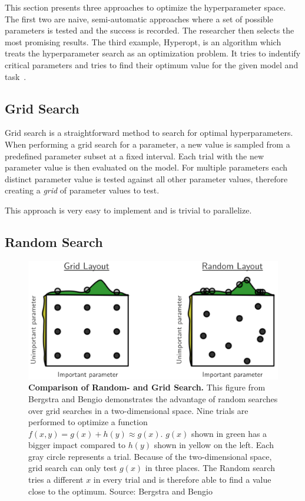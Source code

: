 This section presents three approaches to optimize the hyperparameter space. The first two are naive, semi-automatic approaches where a set of possible parameters is tested and the success is recorded. The researcher then selects the most promising results. The third example, Hyperopt, is an algorithm which treats the hyperparameter search as an optimization problem. It tries to indentify critical parameters and tries to find their optimum value for the given model and task~\cite{Bergstra2013}.


\subsection{Grid Search}

Grid search is a straightforward method to search for optimal hyperparameters. When performing a grid search for a parameter, a new value is sampled from a predefined parameter subset at a fixed interval. Each trial with the new parameter value is then evaluated on the model. For multiple parameters each distinct parameter value is tested against all other parameter values, therefore creating a \textit{grid} of parameter values to test.

This approach is very easy to implement and is trivial to parallelize.

\subsection{Random Search}

\begin{figure}[htb]
    \centering
    \includegraphics[scale=0.35]{figures/03_theory/03_randomSearch}
    \caption{\textbf{Comparison of Random- and Grid Search.} This figure from Bergstra and Bengio demonstrates the advantage of random searches over grid searches in a two-dimensional space. Nine trials are performed to optimize a function $f(x, y) = g(x) + h(y) \approx g(x)$. $g(x)$ shown in green has a bigger impact compared to $h(y)$ shown in yellow on the left. Each gray circle represents a trial. Because of the two-dimensional space, grid search can only test $g(x)$ in three places. The Random search tries a different $x$ in every trial and is therefore able to find a value close to the optimum. Source: Bergstra and Bengio~\cite{Bergstra2012a}}
    \label{fig:03_randomSearch}
\end{figure}

